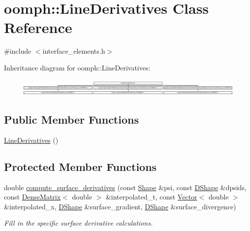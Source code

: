 \hypertarget{classoomph_1_1LineDerivatives}{}\section{oomph\+:\+:Line\+Derivatives Class Reference}
\label{classoomph_1_1LineDerivatives}


{\ttfamily \#include $<$interface\+\_\+elements.\+h$>$}

Inheritance diagram for oomph\+:\+:Line\+Derivatives\+:\begin{figure}[H]
\begin{center}
\leavevmode
\includegraphics[height=0.861539cm]{classoomph_1_1LineDerivatives}
\end{center}
\end{figure}
\subsection*{Public Member Functions}
\begin{DoxyCompactItemize}
\item 
\hyperlink{classoomph_1_1LineDerivatives_ab8e7af32651605a82d53995caddbe7fb}{Line\+Derivatives} ()
\end{DoxyCompactItemize}
\subsection*{Protected Member Functions}
\begin{DoxyCompactItemize}
\item 
double \hyperlink{classoomph_1_1LineDerivatives_aa50209ce504b25d255f9f0a6df36c0e3}{compute\+\_\+surface\+\_\+derivatives} (const \hyperlink{classoomph_1_1Shape}{Shape} \&psi, const \hyperlink{classoomph_1_1DShape}{D\+Shape} \&dpsids, const \hyperlink{classoomph_1_1DenseMatrix}{Dense\+Matrix}$<$ double $>$ \&interpolated\+\_\+t, const \hyperlink{classoomph_1_1Vector}{Vector}$<$ double $>$ \&interpolated\+\_\+x, \hyperlink{classoomph_1_1DShape}{D\+Shape} \&surface\+\_\+gradient, \hyperlink{classoomph_1_1DShape}{D\+Shape} \&surface\+\_\+divergence)
\begin{DoxyCompactList}\small\item\em Fill in the specific surface derivative calculations. \end{DoxyCompactList}\end{DoxyCompactItemize}


